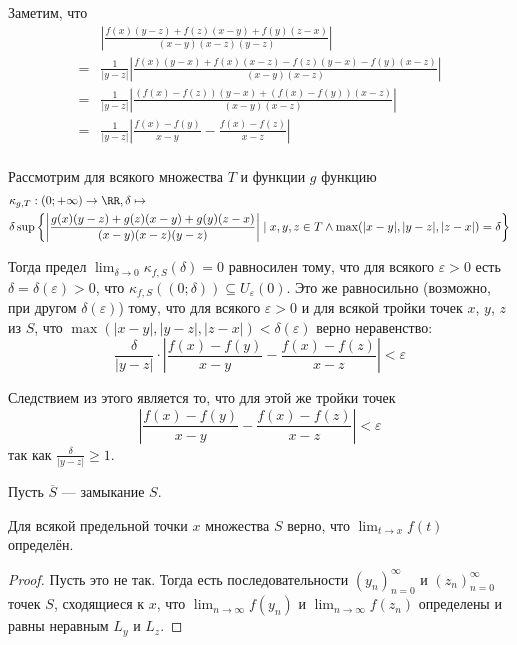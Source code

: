 \documentclass[12pt,a4paper]{article}
\begin{document}
    \begin{enumproblem}
        Заметим, что
        \begin{align*}
            &\left|\frac{f(x)(y-z) + f(z)(x-y) + f(y)(z-x)}{(x-y)(x-z)(y-z)}\right|\\
            = &\frac{1}{|y-z|} \left|\frac{f(x)(y-x) + f(x)(x-z) - f(z)(y-x) - f(y)(x-z)}{(x-y)(x-z)}\right|\\
            = &\frac{1}{|y-z|} \left|\frac{(f(x)-f(z))(y-x) + (f(x)-f(y))(x-z)}{(x-y)(x-z)}\right|\\
            = &\frac{1}{|y-z|} \left|\frac{f(x)-f(y)}{x-y} - \frac{f(x)-f(z)}{x-z}\right|\\
        \end{align*}

        Рассмотрим для всякого множества $T$ и функции $g$ функцию
        \begin{align*}
            &\kappa_{g, T}: (0; +\infty) \to \RR, \delta \mapsto\\
            &\delta \sup \left\{\left|\frac{g(x)(y-z) + g(z)(x-y) + g(y)(z-x)}{(x-y)(x-z)(y-z)}\right| \mid x, y, z \in T \wedge \max(|x-y|, |y-z|, |z-x|) = \delta\right\}
        \end{align*}

        Тогда предел $\lim_{\delta \to 0} \kappa_{f, S}(\delta) = 0$ равносилен тому, что для всякого $\varepsilon > 0$ есть $\delta = \delta(\varepsilon) > 0$, что $\kappa_{f, S}((0; \delta)) \subseteq U_\varepsilon(0)$. Это же равносильно (возможно, при другом $\delta(\varepsilon)$) тому, что для всякого $\varepsilon > 0$ и для всякой тройки точек $x$, $y$, $z$ из $S$, что $\max(|x-y|, |y-z|, |z-x|) < \delta(\varepsilon)$ верно неравенство:
        \[\frac{\delta}{|y-z|} \cdot \left|\frac{f(x)-f(y)}{x-y} - \frac{f(x)-f(z)}{x-z}\right| < \varepsilon\]

        Следствием из этого является то, что для этой же тройки точек
        \[\left|\frac{f(x)-f(y)}{x-y} - \frac{f(x)-f(z)}{x-z}\right| < \varepsilon\]
        так как $\frac{\delta}{|y-z|} \geqslant 1$.

        Пусть $\overline{S}$ --- замыкание $S$.

        \begin{lemma}
            Для всякой предельной точки $x$ множества $S$ верно, что $\lim_{t \to x} f(t)$ определён.
        \end{lemma}

        \begin{proof}
            Пусть это не так. Тогда есть последовательности $(y_n)_{n=0}^\infty$ и $(z_n)_{n=0}^\infty$ точек $S$, сходящиеся к $x$, что $\lim_{n \to \infty} f(y_n)$ и $\lim_{n \to \infty} f(z_n)$ определены и равны неравным $L_y$ и $L_z$.


\end{proof}
\end{enumproblem}
\end{document}
